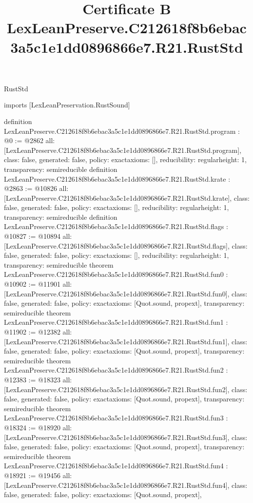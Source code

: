 \begin{lexlean}{RustStd}
\title{Certificate B LexLeanPreserve.C212618f8b6ebac3a5c1e1dd0896866e7.R21.RustStd}
\begin{coremodule}
imports [LexLeanPreservation.RustSound]

definition LexLeanPreserve.C212618f8b6ebac3a5c1e1dd0896866e7.R21.RustStd.program : @0 := @2862 {
  all: [LexLeanPreserve.C212618f8b6ebac3a5c1e1dd0896866e7.R21.RustStd.program],
  class: false,
  generated: false,
  policy: exact{axioms: []},
  reducibility: regular{height: 1},
  transparency: semireducible
}
definition LexLeanPreserve.C212618f8b6ebac3a5c1e1dd0896866e7.R21.RustStd.krate : @2863 := @10826 {
  all: [LexLeanPreserve.C212618f8b6ebac3a5c1e1dd0896866e7.R21.RustStd.krate],
  class: false,
  generated: false,
  policy: exact{axioms: []},
  reducibility: regular{height: 1},
  transparency: semireducible
}
definition LexLeanPreserve.C212618f8b6ebac3a5c1e1dd0896866e7.R21.RustStd.flags : @10827 := @10894 {
  all: [LexLeanPreserve.C212618f8b6ebac3a5c1e1dd0896866e7.R21.RustStd.flags],
  class: false,
  generated: false,
  policy: exact{axioms: []},
  reducibility: regular{height: 1},
  transparency: semireducible
}
theorem LexLeanPreserve.C212618f8b6ebac3a5c1e1dd0896866e7.R21.RustStd.fun0 : @10902 := @11901 {
  all: [LexLeanPreserve.C212618f8b6ebac3a5c1e1dd0896866e7.R21.RustStd.fun0],
  class: false,
  generated: false,
  policy: exact{axioms: [Quot.sound, propext]},
  transparency: semireducible
}
theorem LexLeanPreserve.C212618f8b6ebac3a5c1e1dd0896866e7.R21.RustStd.fun1 : @11902 := @12382 {
  all: [LexLeanPreserve.C212618f8b6ebac3a5c1e1dd0896866e7.R21.RustStd.fun1],
  class: false,
  generated: false,
  policy: exact{axioms: [Quot.sound, propext]},
  transparency: semireducible
}
theorem LexLeanPreserve.C212618f8b6ebac3a5c1e1dd0896866e7.R21.RustStd.fun2 : @12383 := @18323 {
  all: [LexLeanPreserve.C212618f8b6ebac3a5c1e1dd0896866e7.R21.RustStd.fun2],
  class: false,
  generated: false,
  policy: exact{axioms: [Quot.sound, propext]},
  transparency: semireducible
}
theorem LexLeanPreserve.C212618f8b6ebac3a5c1e1dd0896866e7.R21.RustStd.fun3 : @18324 := @18920 {
  all: [LexLeanPreserve.C212618f8b6ebac3a5c1e1dd0896866e7.R21.RustStd.fun3],
  class: false,
  generated: false,
  policy: exact{axioms: [Quot.sound, propext]},
  transparency: semireducible
}
theorem LexLeanPreserve.C212618f8b6ebac3a5c1e1dd0896866e7.R21.RustStd.fun4 : @18921 := @19456 {
  all: [LexLeanPreserve.C212618f8b6ebac3a5c1e1dd0896866e7.R21.RustStd.fun4],
  class: false,
  generated: false,
  policy: exact{axioms: [Quot.sound, propext]},
}
\end{coremodule}
\end{lexlean}
